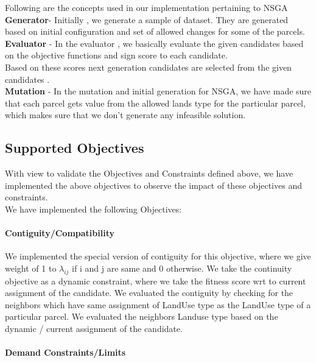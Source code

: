 \documentclass{sig-alternate}
\begin{document}
Following are the concepts used in our implementation pertaining to NSGA\\[.10cm]
\textbf{Generator}- Initially , we generate a sample of dataset. They are generated based on initial configuration and set of allowed changes for some of the parcels. \\[.15cm]
\textbf{Evaluator }- In the evaluator , we basically evaluate the  given candidates based on the objective functions and sign score to each candidate.\\
Based on these scores next generation candidates are selected from the given candidates . \\ [.15cm]
\textbf{Mutation }- In the mutation and initial generation for NSGA, we have made sure that each parcel gets value from the allowed lands type for the particular parcel, which makes sure that we don't generate any infeasible solution.\\[.35cm]


\subsection{Supported Objectives}

With view to validate the Objectives and Constraints defined above, we have implemented the above objectives to observe the impact  of these objectives and constraints.\\[.25cm]

We have implemented the following Objectives:

\paragraph*{Contiguity/Compatibility}

We implemented the special version of contiguity for this objective, where we give weight of 1 to $\lambda_{ij}$ if i and j are same and 0 otherwise.
We  take the continuity objective as a dynamic constraint, where we take the fitness score wrt to current assignment of the candidate. We evaluated the contiguity by checking for the neighbors which have same assignment of LandUse type as the LandUse type of a particular parcel. We evaluated the neighbors Landuse type based  on the dynamic / current assignment of the candidate.

\paragraph*{Demand Constraints/Limits}
\end{document}
